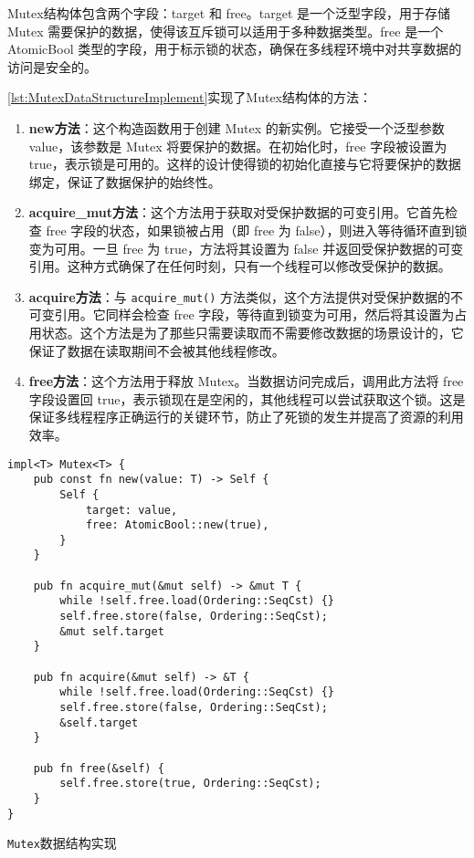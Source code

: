 Mutex结构体包含两个字段：target 和 free。target 是一个泛型字段，用于存储 Mutex 需要保护的数据，使得该互斥锁可以适用于多种数据类型。free 是一个 AtomicBool 类型的字段，用于标示锁的状态，确保在多线程环境中对共享数据的访问是安全的。

\cref{lst:MutexDataStructureImplement}实现了Mutex结构体的方法：

\begin{enumerate}
    \item \textbf{new方法}：这个构造函数用于创建 Mutex 的新实例。它接受一个泛型参数 value，该参数是 Mutex 将要保护的数据。在初始化时，free 字段被设置为 true，表示锁是可用的。这样的设计使得锁的初始化直接与它将要保护的数据绑定，保证了数据保护的始终性。
    \item \textbf{acquire\_mut方法}：这个方法用于获取对受保护数据的可变引用。它首先检查 free 字段的状态，如果锁被占用（即 free 为 false），则进入等待循环直到锁变为可用。一旦 free 为 true，方法将其设置为 false 并返回受保护数据的可变引用。这种方式确保了在任何时刻，只有一个线程可以修改受保护的数据。
    \item \textbf{acquire方法}：与 \texttt{acquire\_mut()} 方法类似，这个方法提供对受保护数据的不可变引用。它同样会检查 free 字段，等待直到锁变为可用，然后将其设置为占用状态。这个方法是为了那些只需要读取而不需要修改数据的场景设计的，它保证了数据在读取期间不会被其他线程修改。
    \item \textbf{free方法}：这个方法用于释放 Mutex。当数据访问完成后，调用此方法将 free 字段设置回 true，表示锁现在是空闲的，其他线程可以尝试获取这个锁。这是保证多线程程序正确运行的关键环节，防止了死锁的发生并提高了资源的利用效率。
\end{enumerate}

\begin{listing}[htbp]
    \begin{verbatim}
impl<T> Mutex<T> {
    pub const fn new(value: T) -> Self {
        Self {
            target: value,
            free: AtomicBool::new(true),
        }
    }

    pub fn acquire_mut(&mut self) -> &mut T {
        while !self.free.load(Ordering::SeqCst) {}
        self.free.store(false, Ordering::SeqCst);
        &mut self.target
    }

    pub fn acquire(&mut self) -> &T {
        while !self.free.load(Ordering::SeqCst) {}
        self.free.store(false, Ordering::SeqCst);
        &self.target
    }

    pub fn free(&self) {
        self.free.store(true, Ordering::SeqCst);
    }
}
    \end{verbatim}
    \caption{\texttt{Mutex}数据结构实现}\label{lst:MutexDataStructureImplement}
\end{listing}

